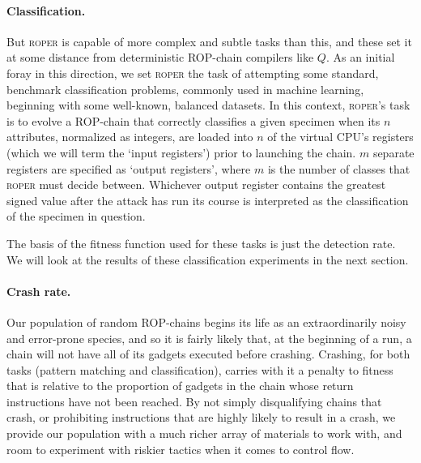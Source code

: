 \paragraph{Classification.} But \textsc{roper} is capable of
more complex and subtle tasks than this, and these set it at some
distance from deterministic ROP-chain compilers like
$Q$. As an initial foray in this direction, we set \textsc{roper}
the task of attempting some standard, benchmark classification
problems, commonly used in machine learning, beginning with some
well-known, balanced datasets. In this context, \textsc{roper}'s
task is to evolve a ROP-chain that correctly classifies
a given specimen when its $n$ attributes, normalized as integers,
are loaded into $n$ of the virtual CPU's registers
(which we will term the `input registers') prior to launching the
chain. $m$ separate registers are specified as `output
registers', where $m$ is the number of classes that
\textsc{roper} must decide between. Whichever output register
contains the greatest signed value after the attack has run its
course is interpreted as the classification of the specimen in
question. 

The basis of the fitness function used for these tasks
is just the detection rate. %
We will look at the results of these classification experiments
in the next section. 

\paragraph{Crash rate.} Our population of random
ROP-chains begins its life as an extraordinarily noisy
and error-prone species, and so it is fairly likely that, at the
beginning of a run, a chain will not have all of its gadgets
executed before crashing.
Crashing,
for both tasks (pattern matching and classification),
carries with it a penalty to fitness that is relative to the
proportion of gadgets in the chain whose return instructions have
not been reached.
By not simply disqualifying chains that
crash, or prohibiting instructions that are highly likely to
result in a crash, we provide our population with a much richer
array of materials to work with, and
room to experiment
with riskier tactics when it comes to control flow.

